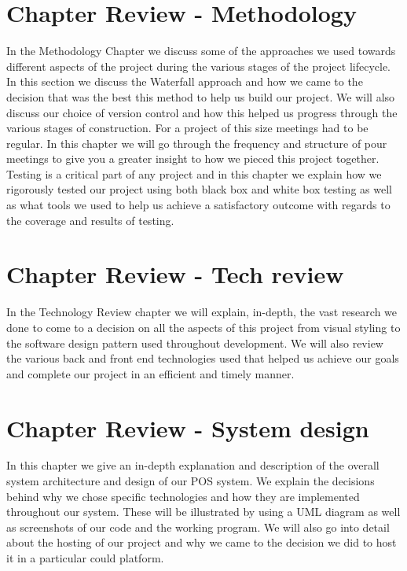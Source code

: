 \section{Chapter Review - Methodology}

In the Methodology Chapter we discuss some of the approaches we used towards different aspects of the project during the various stages of the project lifecycle. In this section we discuss the Waterfall approach and how we came to the decision that was the best this method to help us build our project. We will also discuss our choice of version control and how this helped us progress through the various stages of construction.
For a project of this size meetings had to be regular. In this chapter we will go through the frequency and structure of pour meetings to give you a greater insight to how we pieced this project together.
\newline
\newline
Testing is a critical part of any project and in this chapter we explain how we rigorously tested our project using both black box and white box testing as well as what tools we used to help us achieve a satisfactory outcome with regards to the coverage and results of testing.

\section{Chapter Review - Tech review}

In the Technology Review chapter we will explain, in-depth, the vast research we done to come to a decision on all the aspects of this project from visual styling to the software design pattern used throughout development. We will also review the various back and front end technologies used that helped us achieve our goals and complete our project in an efficient and timely manner.

\section{Chapter Review - System design}

In this chapter we give an in-depth explanation and description of the overall system architecture and design of our POS system. We explain the decisions behind why we chose specific technologies and how they are implemented throughout our system. These will be illustrated by using a UML diagram as well as screenshots of our code and the working program.
\newline
We will also go into detail about the hosting of our project and why we came to the decision we did to host it in a particular could platform.

